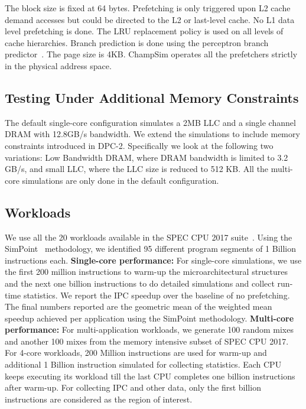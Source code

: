 The block size is fixed at 64 bytes.  Prefetching is only triggered
upon L2 cache demand accesses but could be directed to the L2 or
last-level cache.  No L1 data level prefetching is done. The LRU
replacement policy is used on all levels of cache hierarchies. Branch
prediction is done using the perceptron branch
predictor~\cite{PerceptronPredictor}.  The page size is 4KB.  ChampSim
operates all the prefetchers strictly in the physical address space.

\subsection{Testing Under Additional Memory Constraints}
\label{Method-AdditionalMem}
The default single-core configuration simulates a 2MB LLC and a single
channel DRAM with 12.8GB/s bandwidth. We extend the simulations to
include memory constraints introduced in DPC-2. Specifically we look
at the following two variations: Low Bandwidth DRAM, where DRAM
bandwidth is limited to 3.2 GB/s, and small LLC, where the LLC size is
reduced to 512 KB.  All the multi-core simulations are only done in
the default configuration.

\subsection{Workloads}
\label{Method-Workloads}

We use all the 20 workloads available in the SPEC CPU 2017
suite~\cite{SPEC2017}. Using the SimPoint~\cite{SimPoint} methodology,
we identified 95 different program segments of 1 Billion
instructions each.
\newline
\newline
\noindent \textbf{Single-core performance:} For single-core
simulations, we use the first 200 million instructions to warm-up the
microarchitectural structures and the next one billion instructions to
do detailed simulations and collect run-time statistics. We report the
IPC speedup over the baseline of no prefetching.  The final numbers
reported are the geometric mean of the weighted mean speedup achieved
per application using the SimPoint methodology.
\newline
\newline
\noindent \textbf{Multi-core performance:} For multi-application
workloads, we generate 100 random mixes and another 100 mixes from the
memory intensive subset of SPEC CPU 2017.  For 4-core workloads, 200
Million instructions are used for warm-up and additional 1 Billion
instruction simulated for collecting statistics.  Each CPU keeps
executing its workload till the last CPU completes one billion
instructions after warm-up.  For collecting IPC and other data, only
the first billion instructions are considered as the region of
interest.

